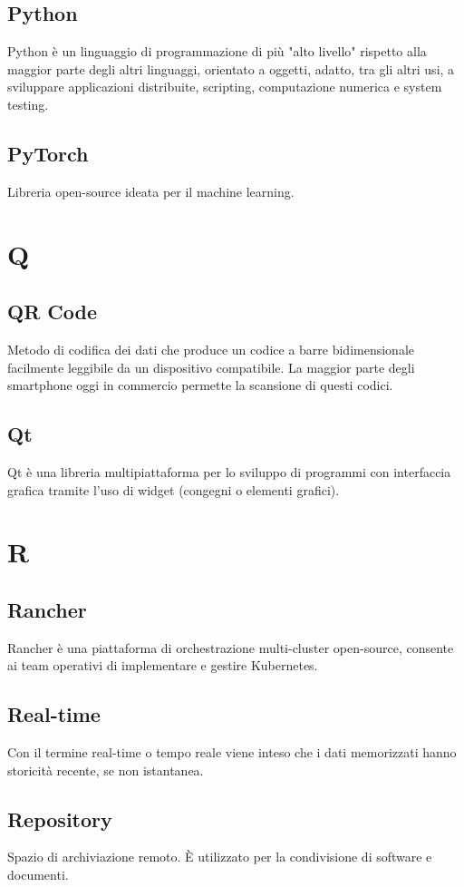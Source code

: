\subsection{Python} Python è un linguaggio di programmazione di più "alto livello" rispetto alla maggior parte degli altri linguaggi, orientato a oggetti, adatto, tra gli altri usi, a sviluppare applicazioni distribuite, scripting, computazione numerica e system testing.
\subsection{PyTorch} Libreria open-source ideata per il machine learning.
\newpage \section{Q}
\subsection{QR Code} Metodo di codifica dei dati che produce un codice a barre bidimensionale facilmente leggibile da un dispositivo compatibile. La maggior parte degli smartphone oggi in commercio permette la scansione di questi codici.
\subsection{Qt} Qt è una libreria multipiattaforma per lo sviluppo di programmi con interfaccia grafica tramite l'uso di widget (congegni o elementi grafici).
\newpage \section{R}
\subsection{Rancher} Rancher è una piattaforma di orchestrazione multi-cluster open-source, consente ai team operativi di implementare e gestire Kubernetes.
\subsection{Real-time} Con il termine real-time o tempo reale viene inteso che i dati memorizzati hanno storicità recente, se non istantanea.
\subsection{Repository} Spazio di archiviazione remoto. È utilizzato per la condivisione di software e documenti.
